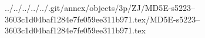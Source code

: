 ../../../../../.git/annex/objects/3p/ZJ/MD5E-s5223--3603c1d04baf1284e7fe059ee311b971.tex/MD5E-s5223--3603c1d04baf1284e7fe059ee311b971.tex